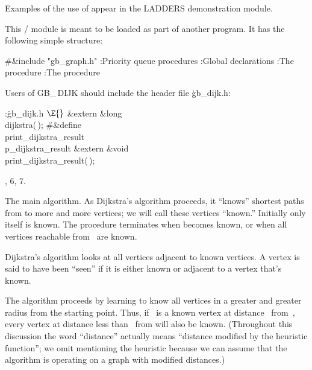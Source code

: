 Examples of the use of  appear in the {\sc LADDERS}
demonstration module.

\fi

This \CEE/ module is meant to be loaded as part of another program.
It has the following simple structure:

\Y\B\8\#\&{include} \.{"gb\_graph.h"}\6
\ATH\7
:Priority queue procedures\X\6
:Global declarations\X\6
:The  procedure\X\6
:The  procedure\X\par
\fi

Users of {\sc GB\_\,DIJK} should include the header file \.{gb\_dijk.h}:

\Y\B\4:\.{gb\_dijk.h }\X${}\E{}$\6
\&{extern} \&{long} \\{dijkstra}(\,);\6
\8\#\&{define} \\{print\_dijkstra\_result} \5\\{p\_dijkstra\_result}\6
\&{extern} \&{void} \\{print\_dijkstra\_result}(\,);\par
{}, 6, 7.\fi

The main algorithm.
As Dijkstra's algorithm proceeds, it ``knows'' shortest paths from 
to more and more vertices; we will call these vertices ``known.''
Initially only  itself is known. The procedure terminates when 
becomes known, or when all vertices reachable from~ are known.

Dijkstra's algorithm looks at all vertices adjacent to known vertices.
A vertex is said to have been ``seen'' if it is either known or
adjacent to a vertex that's known.

The algorithm proceeds by learning to know all vertices in a greater
and greater radius from the starting point. Thus, if ~is a known
vertex at distance~ from~, every vertex at distance less
than~ from
 will also be known.  (Throughout this discussion the word
``distance'' actually means ``distance modified by the heuristic
function''; we omit mentioning the heuristic because we can assume that
the algorithm is operating on a graph with modified distances.)

